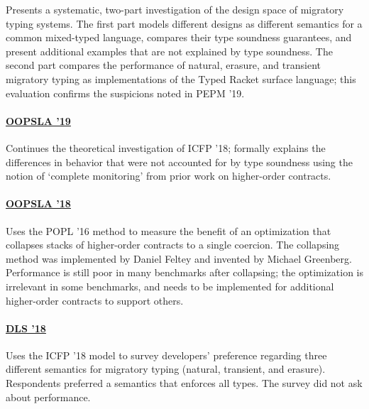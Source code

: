 \documentclass[10pt]{article}
\begin{document}
Presents a systematic, two-part investigation of the design space of migratory typing
 systems.
The first part models different designs as different semantics for a common
 mixed-typed language, compares their type soundness guarantees, and
 present additional examples that are not explained by type soundness.
The second part compares the performance of natural, erasure, and transient
 migratory typing as implementations of the Typed Racket surface language;
 this evaluation confirms the suspicions noted in PEPM '19.


\paragraph{\href{https://www2.ccs.neu.edu/racket/pubs/oopsla19-gfd.pdf}{OOPSLA '19}}

Continues the theoretical investigation of ICFP '18; formally explains the
 differences in behavior that were not accounted for by type soundness using
 the notion of `complete monitoring' from prior work on higher-order contracts.


\paragraph{\href{https://www2.ccs.neu.edu/racket/pubs/oopsla18-fgsfs.pdf}{OOPSLA '18}}
Uses the POPL '16 method to measure the benefit of an optimization that collapses
 stacks of higher-order contracts to a single coercion.
The collapsing method was implemented by Daniel Feltey and invented by
 Michael Greenberg.
Performance is still poor in many benchmarks after collapsing; the optimization
 is irrelevant in some benchmarks, and needs to be implemented for additional
 higher-order contracts to support others.


\paragraph{\href{https://www2.ccs.neu.edu/racket/pubs/dls18-bg.pdf}{DLS '18}}
Uses the ICFP '18 model to survey developers' preference regarding 
 three different semantics for migratory typing (natural, transient, and erasure).
Respondents preferred a semantics that enforces all types.
The survey did not ask about performance.
\end{document}
